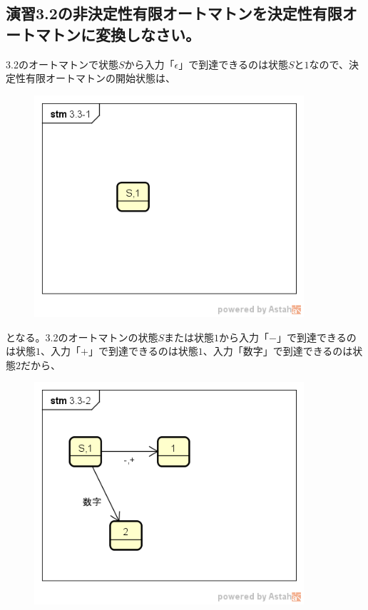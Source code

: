 \documentclass[a4paper,12pt]{jarticle}
\begin{document}
\subsection{演習3.2の非決定性有限オートマトンを決定性有限オートマトンに変換しなさい。}
3.2のオートマトンで状態$ S $から入力「$ \epsilon $」で到達できるのは状態$ S $と$ 1 $なので、決定性有限オートマトンの開始状態は、
\begin{figure}[H]
 \begin{center}
  \includegraphics[width=10cm]{Automatonfig/3-3-1.png}
 \end{center}
\end{figure}
となる。3.2のオートマトンの状態$ S $または状態$ 1 $から入力「$-$」で到達できるのは状態$ 1 $、入力「$ + $」で到達できるのは状態$ 1 $、入力「$ 数字 $」で到達できるのは状態$ 2 $だから、
\begin{figure}[H]
 \begin{center}
  \includegraphics[width=10cm]{Automatonfig/3-3-2.png}
 \end{center}
\end{figure}
\end{document}
